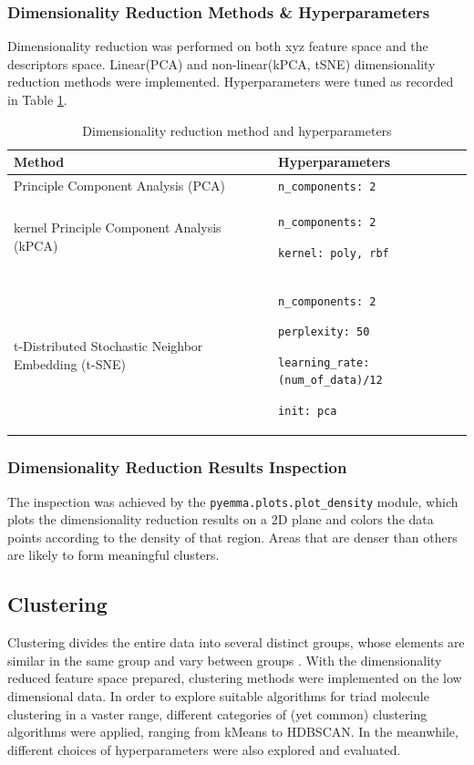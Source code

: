 \documentclass[a4paper]{article}
\begin{document}
\subsubsection{Dimensionality Reduction Methods \& Hyperparameters}
Dimensionality reduction was performed on both xyz feature space and the descriptors space. Linear(PCA) and non-linear(kPCA, tSNE) dimensionality reduction methods were implemented. Hyperparameters were tuned as recorded in Table \ref{table: dimreduct}.

\begin{table}[H]
    \centering
    \caption{Dimensionality reduction method and hyperparameters}
    \begin{tabular}{p{}|p{}}
    \hline \hline
        \textbf{Method} & \textbf{Hyperparameters} \\
        \hline
        Principle Component Analysis (PCA) & \texttt{n\_components: 2} \\
        \hline
        kernel Principle Component Analysis (kPCA) & \texttt{n\_components: 2} \par \texttt{kernel: poly, rbf} \\
        \hline
        t-Distributed Stochastic Neighbor Embedding (t-SNE)\cite{KobakDmitry} & \texttt{n\_components: 2} \par \texttt{perplexity: 50} \par \texttt{learning\_rate: (num\_of\_data)/12} \par \texttt{init: pca} \\
        \hline \hline
    \end{tabular}
    \label{table: dimreduct}
\end{table}

\subsubsection{Dimensionality Reduction Results Inspection}
The inspection was achieved by the \texttt{pyemma.plots.plot\_density} module, which plots the dimensionality reduction results on a 2D plane and colors the data points according to the density of that region. Areas that are denser than others are likely to form meaningful clusters.

\subsection{Clustering}
Clustering divides the entire data into several distinct groups, whose elements are similar in the same group and vary between groups \cite{GlielmoAldo}. With the dimensionality reduced feature space prepared, clustering methods were implemented on the low dimensional data.  In order to explore suitable algorithms for triad molecule clustering in a vaster range, different categories of (yet common) clustering algorithms were applied, ranging from kMeans to HDBSCAN. In the meanwhile, different choices of hyperparameters were also explored and evaluated.
\end{document}
